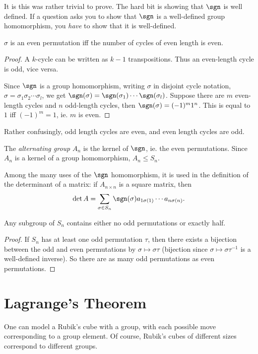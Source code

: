\documentclass[a4paper]{article}
\begin{document}
It is this was rather trivial to prove. The hard bit is showing that $\sgn$ is well defined. If a question asks you to show that $\sgn$ is a well-defined group homomorphism, you \emph{have} to show that it is well-defined.

\begin{lemma}
  $\sigma$ is an even permutation iff the number of cycles of even length is even.
\end{lemma}

\begin{proof}
  A $k$-cycle can be written as $k - 1$ transpositions. Thus an even-length cycle is odd, vice versa.

  Since $\sgn$ is a group homomorphism, writing $\sigma$ in disjoint cycle notation, $\sigma = \sigma_1\sigma_2\cdots\sigma_l$, we get $\sgn(\sigma) = \sgn(\sigma_1)\cdots \sgn(\sigma_l)$. Suppose there are $m$ even-length cycles and $n$ odd-length cycles, then $\sgn(\sigma) = (-1)^m 1^n$. This is equal to $1$ iff $(-1)^m = 1$, ie. $m$ is even.
\end{proof}
Rather confusingly, odd length cycles are even, and even length cycles are odd.

\begin{defi}
  The \emph{alternating group} $A_n$ is the kernel of $\sgn$, ie. the even permutations.
  Since $A_n$ is a kernel of a group homomorphism, $A_n \leq S_n$.
\end{defi}
Among the many uses of the $\sgn$ homomorphism, it is used in the definition of the determinant of a matrix: if $A_{n\times n}$ is a square matrix, then
\[
  \det A = \sum_{\sigma\in S_n}\sgn(\sigma) a_{1\sigma(1)}\cdots a_{n\sigma(n)}.
\]

\begin{prop}
  Any subgroup of $S_n$ contains either no odd permutations or exactly half.
\end{prop}

\begin{proof}
  If $S_n$ has at least one odd permutation $\tau$, then there exists a bijection between the odd and even permutations by $\sigma \mapsto \sigma\tau$ (bijection since $\sigma \mapsto \sigma \tau^{-1}$ is a well-defined inverse). So there are as many odd permutations as even permutations.
\end{proof}

\section{Lagrange's Theorem}
One can model a Rubik's cube with a group, with each possible move corresponding to a group element. Of course, Rubik's cubes of different sizes correspond to different groups.
\end{document}
